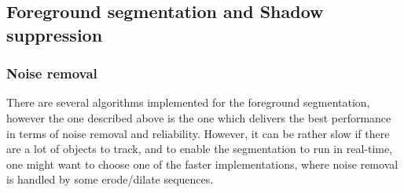 
\subsection{Foreground segmentation and Shadow suppression}

\subsubsection{Noise removal}
There are several algorithms implemented for the foreground segmentation, however the one described above is the one which delivers the best performance in terms of noise removal and reliability. However, it can be rather slow if there are a lot of objects to track, and to enable the segmentation to run in real-time, one might want to choose one of the faster implementations, where noise removal is handled by some erode/dilate sequences.